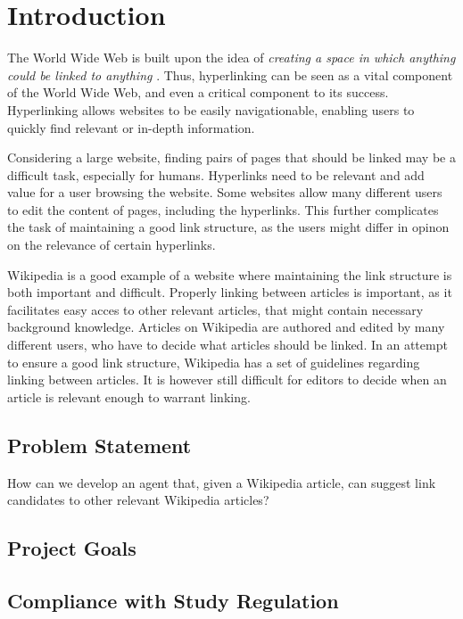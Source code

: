 \chapter{Introduction}
The World Wide Web is built upon the idea of \emph{creating a space in which anything could be linked to anything} . Thus, hyperlinking can be seen as a vital component of the World Wide Web, and even a critical component to its success. Hyperlinking allows websites to be easily navigationable, enabling users to quickly find relevant or in-depth information.

Considering a large website, finding pairs of pages that should be linked may be a difficult task, especially for humans. Hyperlinks need to be relevant and add value for a user browsing the website. Some websites allow many different users to edit the content of pages, including the hyperlinks. This further complicates the task of maintaining a good link structure, as the users might differ in opinon on the relevance of certain hyperlinks.

Wikipedia is a good example of a website where maintaining the link structure is both important and difficult. Properly linking between articles is important, as it facilitates easy acces to other relevant articles, that might contain necessary background knowledge. Articles on Wikipedia are authored and edited by many different users, who have to decide what articles should be linked. In an attempt to ensure a good link structure, Wikipedia has a set of guidelines regarding linking between articles. It is however still difficult for editors to decide when an article is relevant enough to warrant linking.



\section{Problem Statement}
How can we develop an agent that, given a Wikipedia article, can suggest link candidates to other relevant Wikipedia articles?

\section{Project Goals}

\section{Compliance with Study Regulation}

